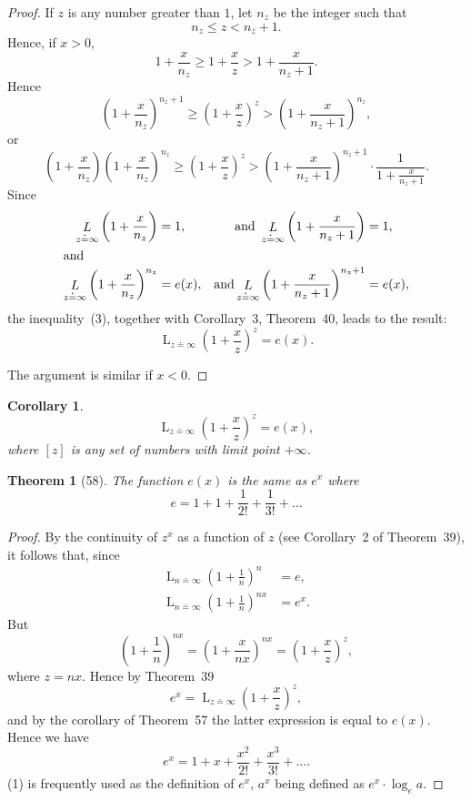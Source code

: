\documentclass[a4paper,12pt]{book}[2004/02/16]
\providecommand{\leqq}{\leq}
\providecommand{\geqq}{\geq}
\providecommand{\colorbox}[2]{#2}
\newcommand{\correction}[2]{\colorbox{corr}{#1}}
\providecommand{\hyperlink}[2]{#2}
\providecommand{\hypertarget}[2]{#2}
\theoremstyle{ilemma}
\theoremstyle{itheorem}
\newtheorem{theorem}{Theorem}
\theoremstyle{iother}
\theoremstyle{icorollary}
\newtheorem{corollary}{Corollary}
\theoremstyle{numcorollary}
\theoremstyle{idefinition}
\begin{document}
\begin{proof}
If $z$ is any number greater than $1$, let $n_z$ be the integer such
that
\[
  n_z\leqq z<n_z+1.
\]
Hence, if $x>0$,
\[
  1+\frac x{n_z}\geqq1+\frac xz >1+\frac x{n_z+1}.
\tag{1}
\]
Hence
\[
  \left(1+\frac x{n_z}\right)^{n_z+1}\geqq
  \left(1+\frac xz\right)^z >
  \left(1+\frac x{n_z+1}\right)^{n_z},
\tag{2}
\]
or
\[
  \left(1+\frac x{n_z}\right)
  \left(1+\frac x{n_z}\right)^{n_z} \geqq
  \left(1+\frac xz\right)^z >
  \left(1+\frac x{n_z+1}\right)^{n_z+1}\cdot
  \frac{1}{1+\frac{x}{n_z+1}}.
\tag{3}
\]
Since
\begin{alignat*}{2}
  \mathop{L}_{z\doteq\infty} \left(1+\frac x{\text{\correction{$n_z$}{$n$}}}\right)
  &=1,
  &\text{ and }
  \mathop{L}_{z\doteq\infty}\left(1+\frac x{n_z+1}\right)
  &=1,\\
\intertext{and}
  \mathop{L}_{z\doteq\infty}\left(1+\frac x{n_z}\right)^{n_z}
  &=e(x),
  &\text{and}
  \mathop{L}_{z\doteq\infty} \left(1+\frac x{n_z+1}\right)^{n_z+1}&=e(x),
\end{alignat*}
the inequality~(3), together with Corollary~\hyperlink{cor3p82}{3}, Theorem~\hyperlink{thm40}{40}, leads to
the result:
\[
  \mathop{L}_{z\doteq\infty} \left(1+\frac xz\right)^z=e(x).
\]

The argument is similar if $x<0$.
\end{proof}

\begin{corollary}
\[
  \mathop{L}_{z\doteq\infty} \left(1+\frac xz\right)^z=e(x),
\]
where $[z]$ is any set of numbers with limit point $+\infty$.
\end{corollary}

\begin{theorem}[58]\hypertarget{thm58}{}\label{t58p99}
The function $e(x)$ is the same as $e^x$ where
\[
  e=1+1+\frac1{2!}+\frac1{3!}+\ldots
\]
\end{theorem}

\begin{proof}
By the continuity of $z^x$ as a function of $z$ (see Corollary~\hyperlink{cor2p81}{2} of
Theorem~\hyperlink{thm39}{39}), it follows that, since
\begin{align*}
  \mathop{L}_{n\doteq \infty}\left(1+\frac1n\right)^n &= e,\\
  \mathop{L}_{n\doteq \infty}\left(1+\frac1n\right)^{nx} &= e^x.
\end{align*}
But
\[
  \left(1+\frac1n\right)^{nx}
  = \left(1+\frac x{nx}\right)^{nx}
  = \left(1+\frac xz\right)^z,
\]
where $z=nx$. Hence by Theorem~\hyperlink{thm39}{39}
\[
  e^x = \mathop{L}_{z\doteq \infty}\left(1+\frac xz\right)^z,
\]
and by the corollary of Theorem~\hyperlink{thm57}{57} the latter expression is equal to
$e(x)$. Hence we have
\hypertarget{eq1p100}{\[
  e^x = 1+x+\frac{x^2}{2!}+\frac{x^3}{3!}+\ldots.\tag{1}
\]}
\hyperlink{eq1p100}{(1)} is frequently used as the definition of $e^x$, $a^x$ being defined
as $e^x\cdot\log_e a$.
\end{proof}
\end{document}
